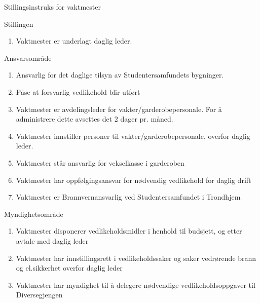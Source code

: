 \begin{instruks*}{Stillingsinstruks for vaktmester}
    \begin{instruksledd}{Stillingen}
        \begin{enumerate}
            \item Vaktmester er underlagt daglig leder.
        \end{enumerate}    
    \end{instruksledd}

    \begin{instruksledd}{Ansvarsområde}
        \begin{enumerate}
            \item Ansvarlig for det daglige tilsyn av Studentersamfundets bygninger.
            \item Påse at forsvarlig vedlikehold blir utført
            \item Vaktmester er avdelingsleder for vakter/garderobepersonale. For å administrere dette avsettes det 2 dager pr.
                måned.
            \item Vaktmester innstiller personer til vakter/garderobepersonale, overfor daglig leder.
            \item Vaktmester står ansvarlig for vekselkasse i garderoben
            \item Vaktmester har oppfølgingsansvar for nødvendig vedlikehold for daglig drift
            \item Vaktmester er Brannvernansvarlig ved Studentersamfundet i Trondhjem
        \end{enumerate}    
    \end{instruksledd}

    \begin{instruksledd}{Myndighetsområde}
        \begin{enumerate}
            \item Vaktmester disponerer vedlikeholdsmidler i henhold til budsjett, og etter avtale med daglig leder
            \item Vaktmester har innstillingsrett i vedlikeholdssaker og saker vedrørende brann og el.sikkerhet overfor daglig
                leder
            \item Vaktmester har myndighet til å delegere nødvendige vedlikeholdsoppgaver til Diversegjengen
        \end{enumerate}
    \end{instruksledd}


\end{instruks*}
